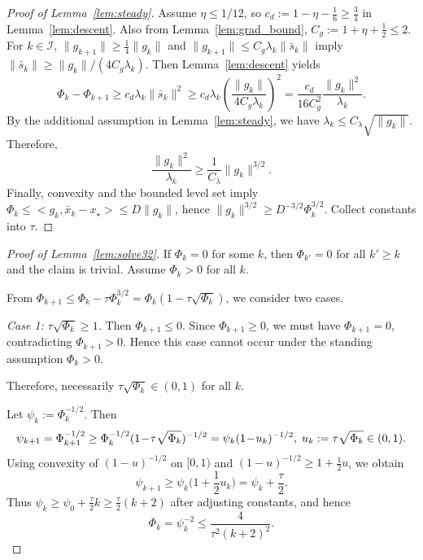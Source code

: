 \documentclass[10pt,twocolumn,letterpaper]{article}
\def\ip#1#2{<#1,#2>}%
\theoremstyle{compact}
\theoremstyle{compactremark}
\newcommand{\ip}[2]{\left\langle #1,#2\right\rangle}
\begin{document}
\begin{proof}[Proof of Lemma~\ref{lem:steady}]
Assume $\eta\le 1/12$, so $c_d:=1-\eta-\frac16\ge \frac34$ in Lemma~\ref{lem:descent}.
Also from Lemma~\ref{lem:grad_bound}, $C_g:=1+\eta+\frac12\le 2$.
For $k\in\mathcal I$, $\|g_{k+1}\|\ge \frac14\|g_k\|$ and $\|g_{k+1}\|\le C_g\lambda_k\|\bar s_k\|$ imply
$\|\bar s_k\|\ge \|g_k\|/(4C_g\lambda_k)$.
Then Lemma~\ref{lem:descent} yields
\[
\Phi_k-\Phi_{k+1}\ge c_d\lambda_k\|\bar s_k\|^2
\ge c_d\lambda_k\left(\frac{\|g_k\|}{4C_g\lambda_k}\right)^2
=\frac{c_d}{16C_g^2}\frac{\|g_k\|^2}{\lambda_k}.
\]
By the additional assumption in Lemma~\ref{lem:steady}, we have $\lambda_k\le C_\lambda\sqrt{\|g_k\|}$.
Therefore,
\[
\frac{\|g_k\|^2}{\lambda_k}\ge \frac{1}{C_\lambda}\|g_k\|^{3/2}.
\]
Finally, convexity and the bounded level set imply $\Phi_k\le \ip{g_k}{\bar x_k-x_\star}\le D\|g_k\|$, hence
$\|g_k\|^{3/2}\ge D^{-3/2}\Phi_k^{3/2}$.
Collect constants into $\tau$.
\end{proof}

\begin{proof}[Proof of Lemma~\ref{lem:solve32}]
If $\Phi_k=0$ for some $k$, then $\Phi_{k'}=0$ for all $k'\ge k$ and the claim is trivial.
Assume $\Phi_k>0$ for all $k$.

From $\Phi_{k+1}\le \Phi_k-\tau \Phi_k^{3/2}=\Phi_k(1-\tau\sqrt{\Phi_k})$, we consider two cases.

\emph{Case 1: $\tau\sqrt{\Phi_k}\ge 1$.}
Then $\Phi_{k+1}\le 0$. Since $\Phi_{k+1}\ge 0$, we must have $\Phi_{k+1}=0$,
contradicting $\Phi_{k+1}>0$.
Hence this case cannot occur under the standing assumption $\Phi_k>0$.

Therefore, necessarily $\tau\sqrt{\Phi_k}\in(0,1)$ for all $k$.

Let $\psi_k:=\Phi_k^{-1/2}$. Then
\[
\psi_{k+1}=\Phi_{k+1}^{-1/2}\ge \Phi_k^{-1/2}(1\!-\!\tau\sqrt{\Phi_k})^{-1/2}\\
=\psi_k(1\!-\!u_k)^{-1/2},\; u_k:=\tau\sqrt{\Phi_k}\in(0,1).
\]
Using convexity of $(1-u)^{-1/2}$ on $[0,1)$ and $(1-u)^{-1/2}\ge 1+\frac12u$, we obtain
\[
\psi_{k+1}\ge \psi_k\Big(1+\frac12 u_k\Big)=\psi_k+\frac{\tau}{2}.
\]
Thus $\psi_k\ge \psi_0+\frac{\tau}{2}k\ge \frac{\tau}{2}(k+2)$ after adjusting constants, and hence
\[
\Phi_k=\psi_k^{-2}\le \frac{4}{\tau^2(k+2)^2}.
\]
\end{proof}
\end{document}
